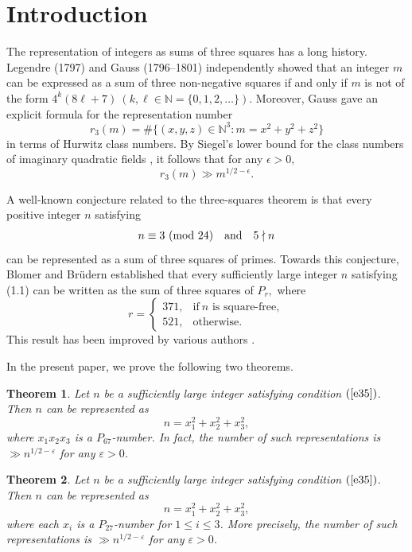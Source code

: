 \documentclass[12pt,a4paper,reqno]{amsart}
\numberwithin{equation}{section}
\def\N{{\mathbb N}}
\def\pmod #1{\ ({\rm{mod}}\ #1)}
\theoremstyle{plain}
\newtheorem{theorem}{Theorem}
\theoremstyle{definition}
\begin{document}
\section{Introduction}
\setcounter{lemma}{0}
\setcounter{theorem}{0}
\setcounter{corollary}{0}
\setcounter{remark}{0}
\setcounter{equation}{0}

 The representation of integers as sums of three squares has a long history. Legendre (1797) and Gauss (1796--1801) independently showed that an integer $m$ can be expressed as a sum of three non-negative squares if and only if $m$ is not of the form $4^k(8\ell+7)\ (k,\ell\in\mathbb{N}=\{0,1,2,\dots\})$. Moreover, Gauss gave an explicit formula for the representation number 
 \[
 r_3(m)=\#\{(x,y,z) \in \N^3: m=x^2+y^2+z^2\}
 \]
in terms of Hurwitz class numbers. 
By Siegel's lower bound for the class numbers of imaginary quadratic fields \cite{Si}, it follows that for any $\epsilon > 0,$
$$r_3(m)\gg m^{1/2 - \epsilon}.$$

A well-known conjecture related to the three-squares theorem is that every positive integer $n$ satisfying
\begin{align}\label{e35}
n \equiv 3 \pmod{24} \quad \text{and} \quad 5 \nmid n
\end{align}
can be represented as a sum of three squares of primes. Towards this conjecture, Blomer and Br\"udern \cite{BB} established that every sufficiently large integer $n$ satisfying (1.1) can be written as the sum of three squares of $P_r,$ where
\[
r = \begin{cases}
371, &\text{if}\ n \text{ is square-free}, \\
521, & \text{otherwise}.
\end{cases}
\]
This result has been improved by various authors \cite{Blo, Lv, Cai, Wa}.

In the present paper, we prove the following two theorems.
\begin{theorem}\label{thm1.2}
Let \(n\) be a sufficiently large integer satisfying condition \((\ref{e35})\).
Then $n$ can be represented as
\[
n=x_1^2+x_2^2+x_3^2,
\]
where $x_1x_2x_3$ is a $P_{67}$-number. In fact, the number of such representations is $\gg n^{1/2-\varepsilon}$ for any $\varepsilon>0$.
\end{theorem}

\begin{theorem}\label{thm1.3}
Let \(n\) be a sufficiently large integer satisfying condition \((\ref{e35})\).
Then $n$ can be represented as
\[
n=x_1^2+x_2^2+x_3^2,
\]
where each $x_i$ is a $P_{27}$-number for $1\le i\le 3$.  More precisely, the number of such representations is $\gg n^{1/2-\varepsilon}$ for any $\varepsilon>0$.
\end{theorem}
\end{document}

